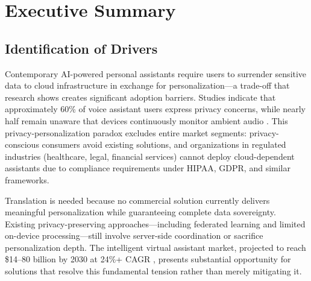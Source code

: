 \documentclass[11pt]{article}
\begin{document}
\newpage


\setcounter{page}{1}



\section{Executive Summary}
\label{sec:summary}
\vspace*{-12pt}
\subsection{Identification of Drivers}\vspace*{-8pt}

Contemporary AI-powered personal assistants require users to surrender sensitive data to cloud infrastructure in exchange for personalization---a trade-off that research shows creates significant adoption barriers. Studies indicate that approximately 60\% of voice assistant users express privacy concerns, while nearly half remain unaware that devices continuously monitor ambient audio \cite{edu2021security, li2023security}. This privacy-personalization paradox excludes entire market segments: privacy-conscious consumers avoid existing solutions, and organizations in regulated industries (healthcare, legal, financial services) cannot deploy cloud-dependent assistants due to compliance requirements under HIPAA, GDPR, and similar frameworks.

Translation is needed because no commercial solution currently delivers meaningful personalization while guaranteeing complete data sovereignty. Existing privacy-preserving approaches---including federated learning and limited on-device processing---still involve server-side coordination or sacrifice personalization depth. The intelligent virtual assistant market, projected to reach \$14--80 billion by 2030 at 24\%+ CAGR \cite{grandview2023iva}, presents substantial opportunity for solutions that resolve this fundamental tension rather than merely mitigating it.
\end{document}

